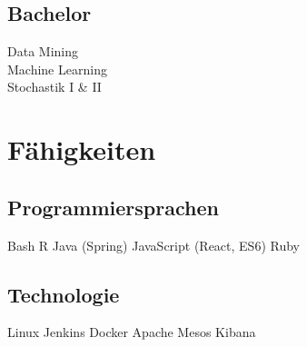 \documentclass[]{deedy-resume-openfont}
\begin{document}
\begin{minipage}[t]{0.33\textwidth}
\subsection{Bachelor}
Data Mining \\
Machine Learning \\
Stochastik I \& II


\section{Fähigkeiten}
\subsection{Programmiersprachen}
Bash \textbullet{} R \textbullet{} Java (Spring) \textbullet{} JavaScript (React, ES6) \textbullet{} Ruby
\sectionsep

\subsection{Technologie}
Linux \textbullet{} Jenkins \textbullet{} Docker \textbullet{} Apache Mesos \textbullet{} Kibana

%
%

\end{minipage}
\hfill
\end{document}
